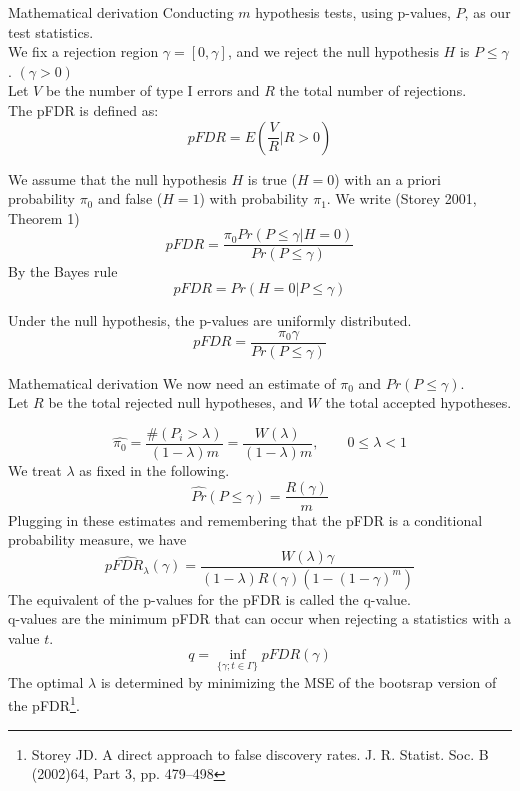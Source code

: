 \documentclass[8pt]{beamer}
\begin{document}
\begin{frame}{Mathematical derivation}
Conducting $m$ hypothesis tests, using p-values, $P$, as our test statistics.\\
We fix a rejection region $\gamma=[0, \gamma]$, and we reject the null hypothesis $H$ is $P\leq\gamma$. $(\gamma>0)$\\
Let $V$ be the number of type I errors and $R$ the total number of rejections.\\
The pFDR is defined as: 
\begin{equation*}
pFDR=E\left(\frac{V}{R}| R>0 \right)
\end{equation*}

We assume that the null hypothesis $H$ is true ($H=0$) with an a priori probability $\pi_0$ and false ($H=1$) with probability $\pi_1$. We write (Storey 2001, Theorem 1)\\
\begin{equation*}
pFDR=\frac{\pi_0 Pr(P\leq\gamma|H=0)}{Pr(P\leq\gamma)}
\end{equation*}
By the Bayes rule 
\begin{equation*}
pFDR = Pr(H=0|P\leq\gamma)
\end{equation*}

Under the null hypothesis, the p-values are uniformly distributed. 
\begin{equation*}
pFDR=\frac{\pi_0\gamma}{Pr(P\leq\gamma)}
\end{equation*} 
\end{frame}

\begin{frame}{Mathematical derivation}
We now need an estimate of $\pi_0$ and $Pr(P\leq\gamma)$.\\ 
Let $R$ be the total rejected null hypotheses, and $W$ the total accepted hypotheses. 

\begin{equation*}
\hat{\pi_0}=\frac{\#(P_i>\lambda)}{(1-\lambda)m}=\frac{W(\lambda)}{(1-\lambda)m}, \qquad 0\leq\lambda< 1
\end{equation*}
We treat $\lambda$ as fixed in the following. 
\begin{equation*}
\hat{Pr}(P\leq\gamma)=\frac{R(\gamma)}{m}
\end{equation*}
Plugging in these estimates and remembering that the pFDR is a conditional probability measure, we have 
\begin{equation*}
p\hat{FDR}_\lambda (\gamma)=\frac{W(\lambda)\gamma}{(1-\lambda)R(\gamma)(1-(1-\gamma)^m)}
\end{equation*}
The equivalent of the p-values for the pFDR is called the q-value.\\
q-values are the minimum pFDR that can occur when rejecting a statistics with a value $t$. 
\begin{equation*}
q = \inf_{\{\gamma; t\in\Gamma\}}pFDR(\gamma)
\end{equation*}
The optimal $\lambda$ is determined by minimizing the MSE of the bootsrap version of the pFDR\footnote{Storey JD. A direct approach to false discovery rates. J. R. Statist. Soc. B (2002)64, Part 3, pp. 479–498}. 
\end{frame}
\end{document}
